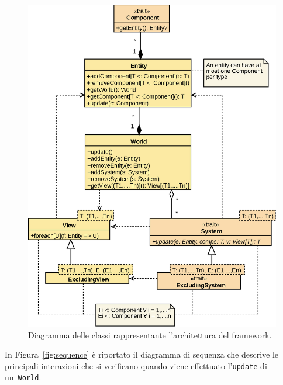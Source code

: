 \begin{figure}[H]
    \centering
    \includegraphics[width=\textwidth]{./img/Architechture}
    \caption{Diagramma delle classi rappresentante l'architettura del framework.}\label{fig:architecture}
\end{figure}

In Figura~\ref{fig:sequence} è riportato il diagramma di sequenza che descrive le principali interazioni che si
verificano quando viene effettuato l'\texttt{update} di un~\texttt{World}.


